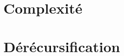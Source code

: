 \documentclass[a4paper, 11pt, oneside]{article}
\begin{document}
\section{Complexité}\label{complexite}
%
%

\section{Dérécursification}\label{derecur}
%
%
\end{document}
